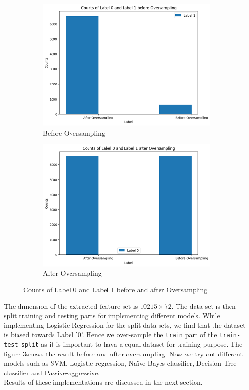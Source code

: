 \documentclass{josis}
\begin{document}
\begin{figure}[H]
    \centering
    \begin{subfigure}[b]{0.45\textwidth}
        \centering
        \includegraphics[width=\textwidth]{before.png}
        \caption{Before Oversampling}
        \label{fig:subfig1}
    \end{subfigure}
    \hfill
    \begin{subfigure}[b]{0.45\textwidth}
        \centering
        \includegraphics[width=\textwidth]{after.png}
        \caption{After Oversampling}
        \label{fig:subfig2}
    \end{subfigure}
    \caption{Counts of Label 0 and Label 1 before and after Oversampling}
    \label{fig:mainfig}
\end{figure}
The dimension of the extracted feature set is $10215\times 72$.
The data set is then split training and testing parts for implementing different models. While implementing Logistic Regression for the split data sets, we find that the dataset is biased towards Label '0'. Hence we over-sample the {\texttt{train}} part of the {\texttt{train-test-split}} as it is important to hava a equal dataset for training purpose. The figure \ref{fig:mainfig}shows the result before and after oversampling. Now we try out different models such as SVM, Logistic regression, Naïve Bayes classifier, Decision Tree classifier and Passive-aggressive.\\
Results of these implementations are discussed in the next section.
\end{document}

